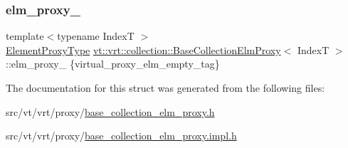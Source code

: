 \subsubsection{\texorpdfstring{elm\+\_\+proxy\+\_\+}{elm\_proxy\_}}
{\footnotesize\ttfamily template$<$typename IndexT $>$ \\
\hyperlink{structvt_1_1vrt_1_1collection_1_1_base_collection_elm_proxy_aeb2058caef8c935a8a88654787672305}{Element\+Proxy\+Type} \hyperlink{structvt_1_1vrt_1_1collection_1_1_base_collection_elm_proxy}{vt\+::vrt\+::collection\+::\+Base\+Collection\+Elm\+Proxy}$<$ IndexT $>$\+::elm\+\_\+proxy\+\_\+ \{virtual\+\_\+proxy\+\_\+elm\+\_\+empty\+\_\+tag\}\hspace{0.3cm}{\ttfamily [protected]}}



The documentation for this struct was generated from the following files\+:\begin{DoxyCompactItemize}
\item 
src/vt/vrt/proxy/\hyperlink{base__collection__elm__proxy_8h}{base\+\_\+collection\+\_\+elm\+\_\+proxy.\+h}\item 
src/vt/vrt/proxy/\hyperlink{base__collection__elm__proxy_8impl_8h}{base\+\_\+collection\+\_\+elm\+\_\+proxy.\+impl.\+h}\end{DoxyCompactItemize}
